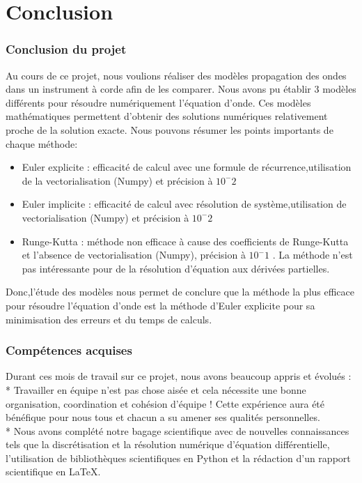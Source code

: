 \part{Conclusion}

\section{Conclusion du projet}
Au cours de ce projet, nous voulions réaliser des modèles propagation des ondes dans un instrument à corde afin de les comparer. Nous avons pu établir 3 modèles différents pour résoudre numériquement l'équation d'onde. Ces modèles mathématiques permettent d'obtenir des solutions numériques relativement proche de la solution exacte.
Nous pouvons résumer les points importants de chaque méthode:
\begin{itemize}
    \item Euler explicite : efficacité de calcul avec une formule de récurrence,utilisation de la vectorialisation (Numpy) et précision à $10^-2$
    \item Euler implicite : efficacité de calcul avec résolution de système,utilisation de vectorialisation (Numpy) et précision à $10^-2$
    \item Runge-Kutta : méthode non efficace à cause des coefficients de Runge-Kutta et l'absence de vectorialisation (Numpy), précision à $10^-1$ . La méthode n'est pas intéressante pour de la résolution d'équation aux dérivées partielles.
\end{itemize}
Donc,l'étude des modèles nous permet de conclure que la méthode la plus efficace pour résoudre l'équation d'onde est la méthode d'Euler explicite pour sa minimisation des erreurs et du temps de calculs.
\section{Compétences acquises}

Durant ces mois de travail sur ce projet, nous avons beaucoup appris et évolués :\\ 

* Travailler en équipe n'est pas chose aisée et cela nécessite une bonne organisation, coordination et cohésion d'équipe ! Cette expérience aura été bénéfique pour nous tous et chacun a su amener ses qualités personnelles.\\

* Nous avons complété notre bagage scientifique avec de nouvelles connaissances tels que la discrétisation et la résolution numérique d'équation différentielle, l'utilisation de bibliothèques scientifiques en Python et la rédaction d'un rapport scientifique en LaTeX.
